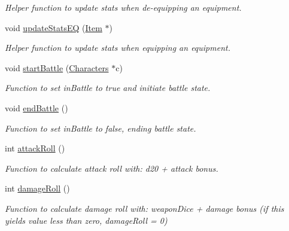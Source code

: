 \begin{DoxyCompactItemize}
\begin{DoxyCompactList}\small\item\em Helper function to update stats when de-\/equipping an equipment. \end{DoxyCompactList}\item 
\hypertarget{class_characters_a1ba5a872f62151bad5874d6b36b8d141}{}\label{class_characters_a1ba5a872f62151bad5874d6b36b8d141} 
void \hyperlink{class_characters_a1ba5a872f62151bad5874d6b36b8d141}{update\+Stats\+EQ} (\hyperlink{class_item}{Item} $\ast$)
\begin{DoxyCompactList}\small\item\em Helper function to update stats when equipping an equipment. \end{DoxyCompactList}\item 
\hypertarget{class_characters_ac7e98c3ef453dad9f68b180438d27a0f}{}\label{class_characters_ac7e98c3ef453dad9f68b180438d27a0f} 
void \hyperlink{class_characters_ac7e98c3ef453dad9f68b180438d27a0f}{start\+Battle} (\hyperlink{class_characters}{Characters} $\ast$c)
\begin{DoxyCompactList}\small\item\em Function to set in\+Battle to true and initiate battle state. \end{DoxyCompactList}\item 
\hypertarget{class_characters_a115192e66e8bd958c49093e76208d17b}{}\label{class_characters_a115192e66e8bd958c49093e76208d17b} 
void \hyperlink{class_characters_a115192e66e8bd958c49093e76208d17b}{end\+Battle} ()
\begin{DoxyCompactList}\small\item\em Function to set in\+Battle to false, ending battle state. \end{DoxyCompactList}\item 
\hypertarget{class_characters_a7b8da28aa1fca4191bf181f6f10ddb23}{}\label{class_characters_a7b8da28aa1fca4191bf181f6f10ddb23} 
int \hyperlink{class_characters_a7b8da28aa1fca4191bf181f6f10ddb23}{attack\+Roll} ()
\begin{DoxyCompactList}\small\item\em Function to calculate attack roll with\+: d20 + attack bonus. \end{DoxyCompactList}\item 
\hypertarget{class_characters_acfbeb255a424493efe9224a1d177ea5c}{}\label{class_characters_acfbeb255a424493efe9224a1d177ea5c} 
int \hyperlink{class_characters_acfbeb255a424493efe9224a1d177ea5c}{damage\+Roll} ()
\begin{DoxyCompactList}\small\item\em Function to calculate damage roll with\+: weapon\+Dice + damage bonus (if this yields value less than zero, damage\+Roll = 0) \end{DoxyCompactList}\item 

\end{DoxyCompactItemize}
